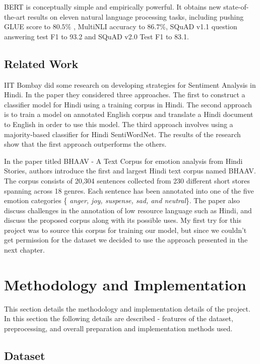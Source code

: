 \documentclass[a4paper, 12pt]{article}
\begin{document}
\begin{sloppypar}
BERT is conceptually simple and empirically powerful. It obtains new state-of-the-art results on eleven natural language processing tasks, including pushing GLUE\cite{wang_glue_2018}
 score to $80.5 \%$ , MultiNLI\cite{williams_broad-coverage_2018}
accuracy to $86.7\%$, SQuAD v1.1\cite{rajpurkar_squad_2016}
question answering test F1 to 93.2  and SQuAD v2.0\cite{rajpurkar_squad_2016}
Test F1 to 83.1.\cite{devlin_bert_2019}

\subsection{Related Work}

IIT Bombay did some research on developing strategies  for Sentiment Analysis in Hindi.  In the paper they considered three approaches. The first to construct a classifier model for Hindi using a training corpus in Hindi. The second approach is to train a model on annotated English corpus and translate a Hindi document to English in order to use this model. The third approach involves using a majority-based classifier for Hindi SentiWordNet. The results of the research show that the first approach outperforms the others.\cite{joshi_fall-back_nodate}

In the paper titled BHAAV - A Text Corpus for emotion analysis from Hindi Stories, authors introduce the first and largest Hindi text corpus named BHAAV. The corpus consists of 20,304 sentences collected from 230 different short stores spanning across 18 genres. Each sentence has been annotated into one of the five emotion categories \{ \textit{anger, joy, suspense, sad, and neutral}\}. The paper also discuss challenges in the annotation of low resource language such as Hindi, and discuss the proposed corpus along with its possible uses.\cite{kumar_bhaav_2019}
My first try for this project was to source this corpus for training our model, but since we couldn't get permission for the dataset we decided to use the approach presented in the next chapter.
\clearpage
\section{Methodology and Implementation}

This section details the methodology and implementation details of the project. In this section the following details are described -  features of the dataset, preprocessing, and overall preparation and implementation methods used.

\subsection{Dataset}


\end{sloppypar}
\end{document}
